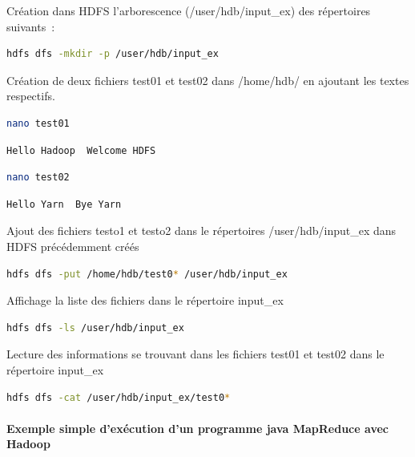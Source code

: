 \documentclass[12pt,english]{book}
\begin{document}
Création dans HDFS l’arborescence (/user/hdb/input\_ex) des répertoires suivants :

\begin{lstlisting}[language=bash, frame=single]
hdfs dfs -mkdir -p /user/hdb/input_ex
\end{lstlisting}

Création de deux fichiers test01 et test02 dans /home/hdb/ en ajoutant les textes respectifs.

\begin{lstlisting}[language=bash, frame=single]
nano test01
\end{lstlisting}

\begin{lstlisting}[language=bash, frame=single]
Hello Hadoop  Welcome HDFS
\end{lstlisting}

\begin{lstlisting}[language=bash, frame=single]
nano test02
\end{lstlisting}

\begin{lstlisting}[language=bash, frame=single]
Hello Yarn  Bye Yarn
\end{lstlisting}

Ajout des fichiers testo1 et testo2 dans le répertoires /user/hdb/input\_ex dans HDFS précédemment créés

\begin{lstlisting}[language=bash, frame=single]
hdfs dfs -put /home/hdb/test0* /user/hdb/input_ex
\end{lstlisting}

Affichage la liste des fichiers dans le répertoire input\_ex

\begin{lstlisting}[language=bash, frame=single]
hdfs dfs -ls /user/hdb/input_ex
\end{lstlisting}

Lecture des informations se trouvant dans les fichiers test01 et test02 dans le répertoire input\_ex  

\begin{lstlisting}[language=bash, frame=single]
hdfs dfs -cat /user/hdb/input_ex/test0*
\end{lstlisting}

\paragraph{Exemple simple d’exécution d’un programme java MapReduce avec Hadoop}\mbox{}\\
\end{document}

